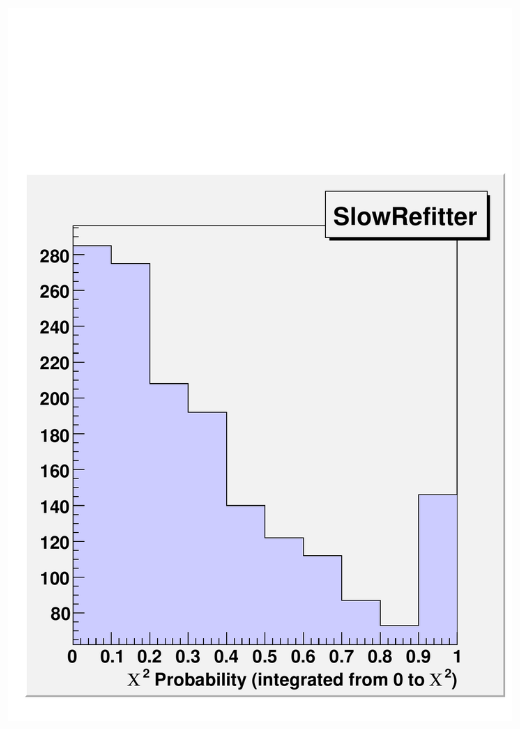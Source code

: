 \documentclass[compress]{beamer}
\begin{document}
\begin{frame}
\begin{columns}
\includegraphics[width=\linewidth]{probability_slow.pdf}
\end{columns}

\end{frame}

\end{document}
